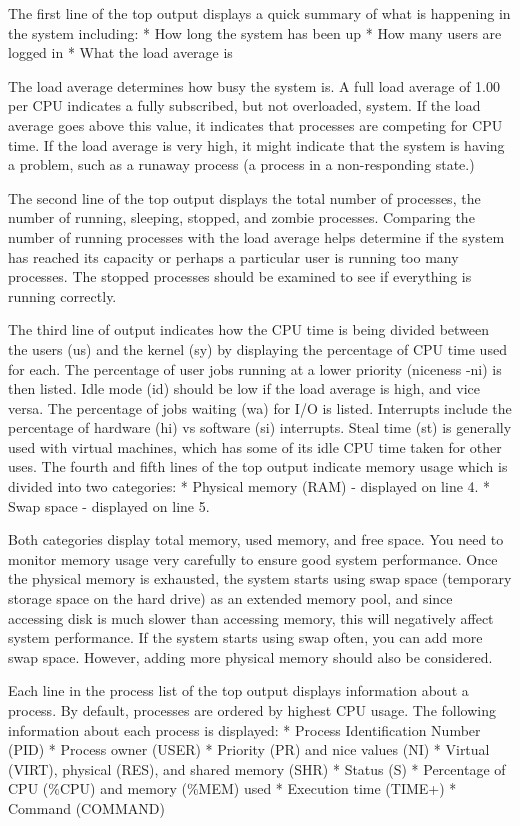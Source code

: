 The first line of the top output displays a quick summary of what is
happening in the system including: * How long the system has been up *
How many users are logged in * What the load average is

The load average determines how busy the system is. A full load average
of 1.00 per CPU indicates a fully subscribed, but not overloaded,
system. If the load average goes above this value, it indicates that
processes are competing for CPU time. If the load average is very high,
it might indicate that the system is having a problem, such as a runaway
process (a process in a non-responding state.)

The second line of the top output displays the total number of
processes, the number of running, sleeping, stopped, and zombie
processes. Comparing the number of running processes with the load
average helps determine if the system has reached its capacity or
perhaps a particular user is running too many processes. The stopped
processes should be examined to see if everything is running correctly.

The third line of output indicates how the CPU time is being divided
between the users (us) and the kernel (sy) by displaying the percentage
of CPU time used for each. The percentage of user jobs running at a
lower priority (niceness -ni) is then listed. Idle mode (id) should be
low if the load average is high, and vice versa. The percentage of jobs
waiting (wa) for I/O is listed. Interrupts include the percentage of
hardware (hi) vs software (si) interrupts. Steal time (st) is generally
used with virtual machines, which has some of its idle CPU time taken
for other uses. The fourth and fifth lines of the top output indicate
memory usage which is divided into two categories: * Physical memory
(RAM) - displayed on line 4. * Swap space - displayed on line 5.

Both categories display total memory, used memory, and free space. You
need to monitor memory usage very carefully to ensure good system
performance. Once the physical memory is exhausted, the system starts
using swap space (temporary storage space on the hard drive) as an
extended memory pool, and since accessing disk is much slower than
accessing memory, this will negatively affect system performance. If the
system starts using swap often, you can add more swap space. However,
adding more physical memory should also be considered.

Each line in the process list of the top output displays information
about a process. By default, processes are ordered by highest CPU usage.
The following information about each process is displayed: * Process
Identification Number (PID) * Process owner (USER) * Priority (PR) and
nice values (NI) * Virtual (VIRT), physical (RES), and shared memory
(SHR) * Status (S) * Percentage of CPU (\%CPU) and memory (\%MEM) used *
Execution time (TIME+) * Command (COMMAND)

